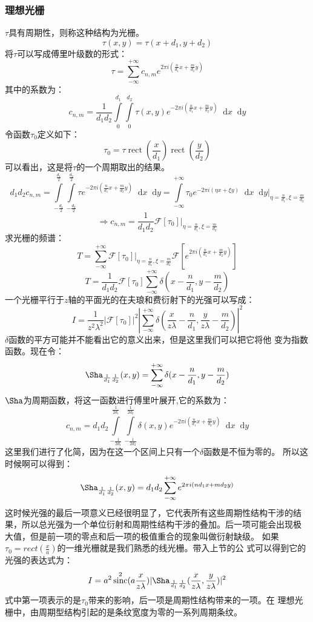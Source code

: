 \documentclass{article}
\DeclareMathOperator{\sinc}{sinc}
\DeclareMathOperator{\rect}{rect}
\newcommand*{\dif}{\mathop{}\!\mathrm{d}}
\begin{document}
\subsubsection{理想光栅}
$\tau$具有周期性，则称这种结构为光栅。
\[\tau(x,y)=\tau(x+d_1,y+d_2)\]
将$\tau$可以写成傅里叶级数的形式：
\[\tau=\sum_{-\infty}^{+\infty}c_{n,m}e^{2\pi
    i(\frac{n}{d_1}x+\frac{m}{d_2}y)}\]
其中的系数为：
\[c_{n,m}=\frac{1}{d_1d_2}\int\limits_0^{d_1}\int\limits_0^{d_2}\tau(x,y)e^{-2\pi
    i(\frac{n}{d_1}x+\frac{m}{d_2}y)}\dif x\dif y\]
令函数$\tau_0$定义如下：
\[\tau_0=\tau\rect(\frac{x}{d_1})\rect(\frac{y}{d_2})\]
可以看出，这是将$\tau$的一个周期取出的结果。
\[d_1d_2c_{n,m}=\int\limits_{-\frac{d_1}{2}}^{\frac{d_1}{2}}\int\limits_{-\frac{d_2}{2}}^{\frac{d_2}{2}}\tau
  e^{-2\pi i(\frac{n}{d_1}x+\frac{m}{d_2}y)}\dif
  x\dif y=\int\limits_{-\infty}^{+\infty}\tau_0e^{-2\pi i(\eta x+\xi
    y)}\dif x\dif y|_{\eta=\frac{n}{d_1},\xi=\frac{m}{d_2}}\]
\[\Rightarrow
  c_{n,m}=\frac{1}{d_1d_2}\mathscr{F}[\tau_0]|_{\eta=\frac{n}{d_1},\xi=\frac{m}{d_2}}\]
求光栅的频谱：
\[T=\sum_{-\infty}^{+\infty}\mathscr{F}[\tau_0]|_{\eta=\frac{n}{d_1},\xi=\frac{m}{d_2}}\mathscr{F}[e^{2\pi
    i(\frac{n}{d_1}x+\frac{m}{d_2}y)}]\]
\begin{equation}
  \label{eq:10}
  T=\frac{1}{d_1d_2}\mathscr{F}[\tau_0]\sum_{-\infty}^{+\infty}\delta(x-\frac{n}{d_{1}},y-\frac{m}{d_2})
\end{equation}
一个光栅平行于$z$轴的平面光的在夫琅和费衍射下的光强可以写成：
\[I=\frac{1}{z^2\lambda^2}|\mathscr{F}[\tau_0]|^2|\sum_{-\infty}^{+\infty}\delta(\frac{x}{z\lambda}-\frac{n}{d_1},\frac{y}{z\lambda}-\frac{m}{d_2})|^2\]
$\delta$函数的平方可能并不能看出它的意义出来，但是这里我们可以把它将他
变为指数函数。现在令：
\[\Sha_{\frac{1}{d_1}\frac{1}{d_2}}(x,y)=\sum_{-\infty}^{+\infty}\delta(x-\frac{n}{d_1},y-\frac{m}{d_2})\]
$\Sha$为周期函数，将这一函数进行傅里叶展开,它的系数为：
\[c_{n,m}=d_1d_2
  \int\limits_{-\frac{1}{2d_1}}^{\frac{1}{2d_1}}\int\limits_{-\frac{1}{2d_2}}^{\frac{1}{2d_2}}\delta(x,y)e^{-2\pi
    i(\frac{n}{d_1}x+\frac{m}{d_2}y)}\dif
  x\dif y\]
这里我们进行了化简，因为在这一个区间上只有一个$\delta$函数是不恒为零的。
所以这时候啊可以得到：
\[\Sha_{\frac{1}{d_1}\frac{1}{d_2}}(x,y)=d_1d_2\sum_{-\infty}^{+\infty}e^{2\pi
    i(nd_1x+md_2y)}\]
这时候光强的最后一项意义已经很明显了，它代表所有这些周期性结构干涉的结
果，所以总光强为一个单位衍射和周期性结构干涉的叠加。后一项可能会出现极
大值，但是前一项的零点和后一项的极值重合的现象叫做衍射缺级。
如果$\tau_0=rect(\frac{x}{a})$的一维光栅就是我们熟悉的线光栅。带入上节的公
式可以得到它的光强的表达式为：
\[I=a^2\sinc^2(a
  \frac{x}{z\lambda})|\Sha_{\frac{1}{d_1}\frac{1}{d_2}}(\frac{x}{z\lambda},\frac{y}{z\lambda})|^2\]
式中第一项表示的是$\tau_0$带来的影响，后一项是周期性结构带来的一项。在
理想光栅中，由周期型结构引起的是条纹宽度为零的一系列周期条纹。
\end{document}
